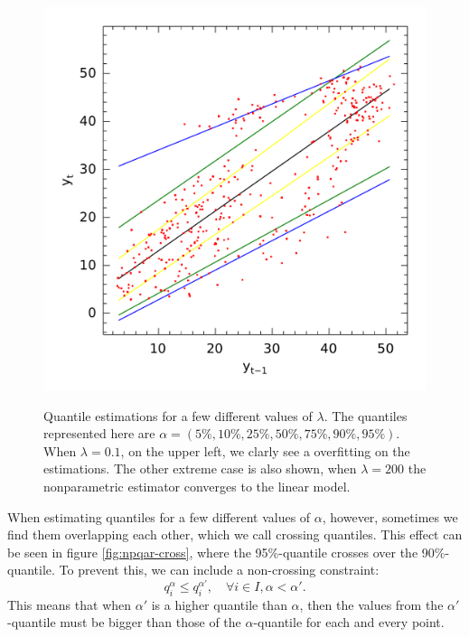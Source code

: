 \begin{figure}[htp]
\begin{minipage}[t]{0.4\linewidth}
\begin{minipage}[b]{\linewidth}
    \end{minipage}
     \begin{minipage}[b]{\linewidth}
      \centering     \includegraphics[width=\textwidth]{Figuras/npqar/icaraizinho-crossing-200}
      \label{fig:npqar-cross}
     \end{minipage}
  \end{minipage}
  \caption{Quantile estimations for a few different values of $\lambda$. The quantiles represented here are $\alpha = (5\%, 10\%, 25\%, 50\%, 75\%, 90\%, 95\%)$. When $\lambda = 0.1$, on the upper left, we clarly see a overfitting on the estimations. The other extreme case is also shown, when $\lambda=200$ the nonparametric estimator converges to the linear model.}
  \label{fig:npqar-results}
\end{figure}


When estimating quantiles for a few different values of $\alpha$, however, sometimes we find them overlapping each other, which we call crossing quantiles. This effect can be seen in figure \ref{fig:npqar-cross}, where the 95\%-quantile crosses over the 90\%-quantile. To prevent this, we can include a non-crossing constraint:
\begin{equation}
q_i^{\alpha} \leq q_i^{\alpha'}, \quad \forall i \in I, \alpha < \alpha'.
\end{equation}
This means that when $\alpha'$ is a higher quantile than $\alpha$, then the values from the $\alpha'$-quantile must be bigger than those of the $\alpha$-quantile for each and every point.


